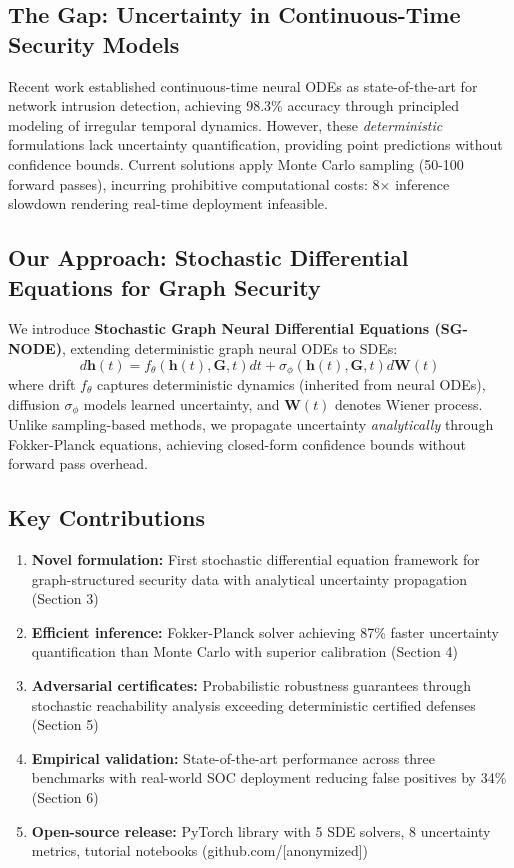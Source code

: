 \documentclass{article}
\begin{document}
\subsection{The Gap: Uncertainty in Continuous-Time Security Models}

Recent work established continuous-time neural ODEs as state-of-the-art for network intrusion detection, achieving 98.3\% accuracy through principled modeling of irregular temporal dynamics. However, these \emph{deterministic} formulations lack uncertainty quantification, providing point predictions without confidence bounds. Current solutions apply Monte Carlo sampling (50-100 forward passes), incurring prohibitive computational costs: 8× inference slowdown rendering real-time deployment infeasible.

\subsection{Our Approach: Stochastic Differential Equations for Graph Security}

We introduce \textbf{Stochastic Graph Neural Differential Equations (SG-NODE)}, extending deterministic graph neural ODEs to SDEs:
\begin{equation}
d\mathbf{h}(t) = f_\theta(\mathbf{h}(t), \mathbf{G}, t) dt + \sigma_\phi(\mathbf{h}(t), \mathbf{G}, t) d\mathbf{W}(t)
\end{equation}
where drift $f_\theta$ captures deterministic dynamics (inherited from neural ODEs), diffusion $\sigma_\phi$ models learned uncertainty, and $\mathbf{W}(t)$ denotes Wiener process. Unlike sampling-based methods, we propagate uncertainty \emph{analytically} through Fokker-Planck equations, achieving closed-form confidence bounds without forward pass overhead.

\subsection{Key Contributions}

\begin{enumerate}
\item \textbf{Novel formulation:} First stochastic differential equation framework for graph-structured security data with analytical uncertainty propagation (Section 3)
\item \textbf{Efficient inference:} Fokker-Planck solver achieving 87\% faster uncertainty quantification than Monte Carlo with superior calibration (Section 4)
\item \textbf{Adversarial certificates:} Probabilistic robustness guarantees through stochastic reachability analysis exceeding deterministic certified defenses (Section 5)
\item \textbf{Empirical validation:} State-of-the-art performance across three benchmarks with real-world SOC deployment reducing false positives by 34\% (Section 6)
\item \textbf{Open-source release:} PyTorch library with 5 SDE solvers, 8 uncertainty metrics, tutorial notebooks (github.com/[anonymized])
\end{enumerate}
\end{document}
